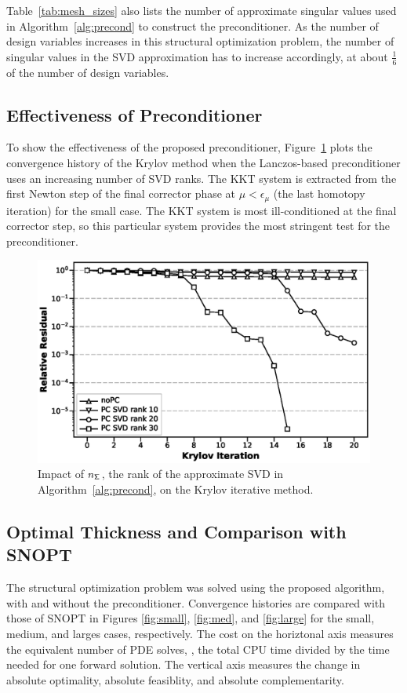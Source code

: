 Table~\ref{tab:mesh_sizes} also lists the number of approximate singular values
used in Algorithm~\ref{alg:precond} to construct the preconditioner.  As the number of design variables
increases in this structural optimization problem, the number of singular values
in the SVD approximation has to increase accordingly, at about $\frac{1}{6}$
of the number of design variables.

\subsection{Effectiveness of Preconditioner}
To show the effectiveness of the proposed preconditioner, 
Figure~\ref{fig:svdrank} plots the convergence history of the Krylov
method when the Lanczos-based preconditioner uses an 
increasing number of SVD ranks. The KKT system is extracted from 
the first Newton step of the final corrector phase 
at $\mu < \epsilon_{\mu}$ (\ie the last homotopy iteration) for the small case. 
The KKT system is most ill-conditioned at the final corrector step, so this particular system provides the most stringent test for the preconditioner.

\begin{figure}[tbp]
  \centering
  \includegraphics[width=1.0\textwidth]{./figs/chap6_fstopo/tiny_svd_ranks.eps}
  \caption{Impact of $n_{\mathsf{\Sigma}}$, the rank of the approximate SVD in
    Algorithm~\ref{alg:precond}, on the Krylov iterative method.
  \label{fig:svdrank}}
\end{figure}

\subsection{Optimal Thickness and Comparison with SNOPT}
The structural optimization problem was solved using the proposed algorithm,
with and without the preconditioner. Convergence histories are compared with 
those of SNOPT in Figures \ref{fig:small}, \ref{fig:med}, and \ref{fig:large} for the 
small, medium, and larges cases, respectively. The cost on the horiztonal axis 
measures the equivalent number of PDE solves, 
\ie, the total CPU time divided by the time needed for one
forward solution.  The vertical axis measures the change in absolute optimality, 
absolute feasiblity, and absolute complementarity.    

